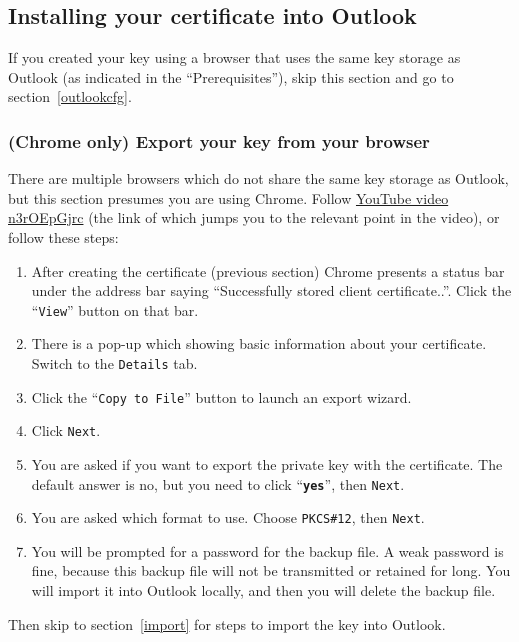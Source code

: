 \documentclass[pdftex,12pt,titlepage=false]{scrartcl}
\begin{document}
\subsection{Installing your certificate into Outlook}\label{cert_install}
If you created your key using a browser that uses the same key storage
as Outlook (as indicated in the ``Prerequisites''), skip this section
and go to section~\ref{outlookcfg}.

\subsubsection{(Chrome only) Export your key from your browser}\label{chrome_export}
There are multiple browsers which do not share the same key storage as
Outlook, but this section presumes you are using Chrome.  Follow
\href{https://www.youtube.com/watch?v=n3rOEpGjrc\&start=310}{YouTube
  video n3rOEpGjrc} (the link of which jumps you to the relevant point
in the video), or follow these steps:
\begin{multicols}{2}
  \begin{enumerate}
  \item After creating the certificate (previous section) Chrome
    presents a status bar under the address bar saying ``Successfully
    stored client certificate..''.  Click the ``\texttt{View}'' button
    on that bar.
  \item There is a pop-up which showing basic information about your
    certificate.  Switch to the \texttt{Details} tab.
  \item Click the ``\texttt{Copy to File}'' button to launch an export
    wizard.
  \item Click \texttt{Next}.
  \item You are asked if you want to export the private key with the
    certificate.  The default answer is no, but you need to click
    ``\textbf{\texttt{yes}}'', then \texttt{Next}.
  \item You are asked which format to use.  Choose \texttt{PKCS\#12},
    then \texttt{Next}.
  \item You will be prompted for a password for the backup file.  A
    weak password is fine, because this backup file will not be
    transmitted or retained for long.  You will import it into Outlook
    locally, and then you will delete the backup file.
  \end{enumerate}
\end{multicols}

Then skip to section~\ref{import} for steps to import the key into
Outlook.
\end{document}
